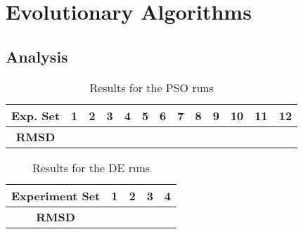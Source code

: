 \section{Evolutionary Algorithms}

\subsection{Analysis}

\begin{table}
	\centering
	\begin{tabular}{ | >{\bfseries}c | c | c | c | c | c | c | c | c | c | c | c | c | }
		\hline
		Exp. Set & 1 & 2 & 3 & 4 & 5 & 6 & 7 & 8 & 9 & 10 & 11 & 12 \\ \hline
		RMSD &  &  &  &  &  &  &  &  &  &  &  &  \\ \hline
	\end{tabular}
	\caption{Results for the PSO runs}
	\label{table:ea-pso-results}
\end{table}

\begin{table}
	\centering
	\begin{tabular}{ | >{\bfseries}c | c | c | c | c | }
		\hline
		Experiment Set & 1 & 2 & 3 & 4 \\ \hline
		RMSD &  &  &  &  \\ \hline
	\end{tabular}
	\caption{Results for the DE runs}
	\label{table:ea-de-results}
\end{table}